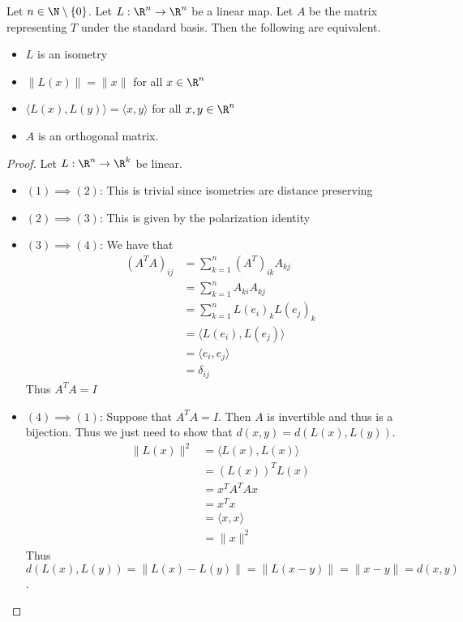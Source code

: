 \documentclass[a4paper]{article}
\begin{document}
\begin{prp}{}{} Let $n\in\N\setminus\{0\}$. Let $L:\R^n\to\R^n$ be a linear map. Let $A$ be the matrix representing $T$ under the standard basis. Then the following are equivalent. 
\begin{itemize}
\item $L$ is an isometry
\item $\|L(x)\|=\|x\|$ for all $x\in\R^n$
\item $\langle L(x),L(y)\rangle=\langle x,y\rangle$ for all $x,y\in\R^n$
\item $A$ is an orthogonal matrix. 
\end{itemize}\tcbline
\begin{proof} Let $L:\R^n\to\R^k$ be linear. 
\begin{itemize}
\item $(1)\implies(2)$: This is trivial since isometries are distance preserving
\item $(2)\implies(3)$: This is given by the polarization identity
\item $(3)\implies(4)$: We have that  
\begin{align*}
\left(A^TA\right)_{ij}&=\sum_{k=1}^n(A^T)_{ik}A_{kj}\\
&=\sum_{k=1}^nA_{ki}A_{kj}\\
&=\sum_{k=1}^nL(e_i)_kL(e_j)_k\\
&=\langle L(e_i),L(e_j)\rangle\\
&=\langle e_i,e_j\rangle\tag{By $(3)$}\\
&=\delta_{ij}
\end{align*} Thus $A^TA=I$
\item $(4)\implies(1)$: Suppose that $A^TA=I$. Then $A$ is invertible and thus is a bijection. Thus we just need to show that $d(x,y)=d(L(x),L(y))$.
\begin{align*}
\|L(x)\|^2&=\langle L(x),L(x)\rangle\\
&=(L(x))^TL(x)\\
&=x^TA^TAx\\
&=x^Tx\\
&=\langle x,x\rangle\\
&=\|x\|^2
\end{align*}
Thus $d(L(x),L(y))=\|L(x)-L(y)\|=\|L(x-y)\|=\|x-y\|=d(x,y)$. 
\end{itemize}
\end{proof}
\end{prp}
\end{document}
